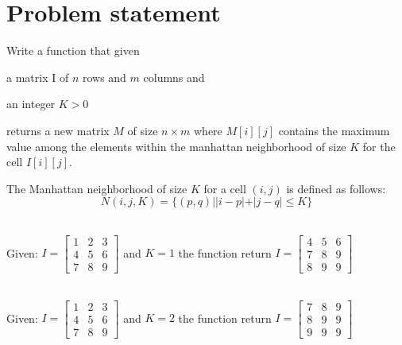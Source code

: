 \section{Problem statement}
\begin{exercise}
\label{example:max_manhattan:exercice1}
Write a function that given \begin{enumerate*}
	\item a matrix I of $n$ rows and $m$ columns and
	\item  an integer $K > 0$
\end{enumerate*}
returns a new matrix $M$ of size $n \times m$ where $M[i][j]$ contains the maximum value among the elements 
within the manhattan neighborhood of size $K$ for the cell $I[i][j]$.

The Manhattan neighborhood of size $K$ for a cell $(i,j)$ is defined as follows:
\begin{equation}
	N(i,j, K) = \{(p,q) | |i-p|+|j-q| \leq K\}
\end{equation}


\end{exercise}
	\begin{example}
		\label{example:max_manhattan:example1}
		\hfill \\
		Given: $I=
		\begin{bmatrix}
		  1 & 2 & 3  \\
		  4 & 5 & 6  \\
		  7 & 8 & 9  
		\end{bmatrix}
	  $
  and $K=1$ the function return $I=
  \begin{bmatrix}
	  4 & 5 & 6  \\
	  7 & 8 & 9  \\
	  8 & 9 & 9  
	\end{bmatrix}
$
		
	\end{example}

	\begin{example}
		\label{example:max_manhattan:example2}
		\hfill \\
		Given: $I=
		\begin{bmatrix}
		  1 & 2 & 3  \\
		  4 & 5 & 6  \\
		  7 & 8 & 9  
		\end{bmatrix}
	  $
  and $K=2$ the function return $I=
  \begin{bmatrix}
	  7 & 8 & 9  \\
	  8 & 9 & 9  \\
	  9 & 9 & 9  
	\end{bmatrix}
$
		
	\end{example}

